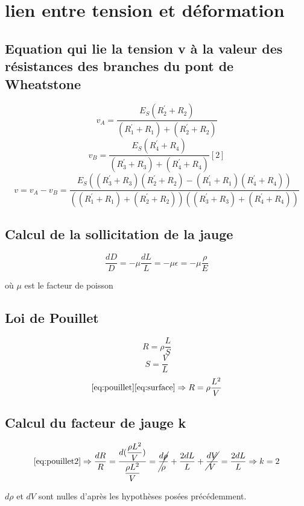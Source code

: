 \documentclass[10pt,a4paper]{report}
\begin{document}
\chapter{lien entre tension et déformation}
\section*{Equation  qui lie la tension v à la valeur des résistances des branches du pont de Wheatstone}
\begin{equation}v_{A} = \dfrac{E_{S}(R^{'}_{2}+R_{2})}{(R^{'}_{1}+R_{1})+(R^{'}_{2}+R_{2})}\end{equation} 
\begin{equation}v_{B} = \dfrac{E_{S}(R^{'}_{4}+R_{4})}{(R^{'}_{3}+R_{3})+(R^{'}_{4}+R_{4})} [2]\end{equation} 
\begin{equation}
v = v_{A} - v_{B} = \dfrac{E_{S}((R^{'}_{3}+R_{3})(R^{'}_{2}+R_{2})-(R^{'}_{1}+R_{1})(R^{'}_{4}+R_{4}))}{((R^{'}_{1}+R_{1})+(R^{'}_{2}+R_{2}))((R^{'}_{3}+R_{3})+(R^{'}_{4}+R_{4}))} \end{equation} 

\section*{Calcul de la sollicitation de la jauge}
\begin{equation}
\label{eq:poisson}
\dfrac{dD}{D} = - \mu \dfrac{dL}{L} = - \mu \epsilon =  - \mu \dfrac{\rho}{E}
\end{equation}
\begin{center}où $\mu$ est le facteur de poisson\end{center}
\section*{Loi de Pouillet}
\begin{equation}
\label{eq:pouillet}
R = \rho \dfrac{L}{S}
\end{equation}
\begin{equation}
\label{eq:surface}
 S  = \dfrac{V}{L} 
\end{equation}
\begin{equation}
\label{eq:pouillet2}
\eqref{eq:pouillet}\eqref{eq:surface} \Rightarrow  R = \rho \dfrac{L^{2}}{V}
 \end{equation}
\section*{Calcul du facteur de jauge k}
\begin{equation}
\eqref{eq:pouillet2} \Rightarrow \dfrac{dR}{R} = \dfrac{d(\dfrac{\rho L^{2}}{V})}{\dfrac{\rho L^{2}}{V}} =  \cancel{\dfrac{d\rho}{\rho}}+ \dfrac{2dL}{L}+\cancel{\dfrac{dV}{V}}  =  \dfrac{2dL}{L} \Rightarrow k = 2
\end{equation}
\begin{center}$d\rho$ et $dV$ sont nulles d'après les hypothèses posées précédemment.\end{center}
\end{document}
